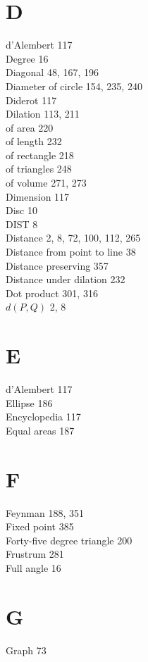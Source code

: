 \documentclass[12pt]{book} %
\begin{document}
\begin{ExerciseList}
\begin{ExerciseList}
\begin{ExerciseList}
\section*{D}
d'Alembert 117\\
Degree 16\\
Diagonal 48, 167, 196\\
Diameter of circle 154, 235, 240\\
Diderot 117\\
Dilation 113, 211\\
\hspace*{1em}of area 220\\
\hspace*{1em}of length 232\\
\hspace*{1em}of rectangle 218\\
\hspace*{1em}of triangles 248\\
\hspace*{1em}of volume 271, 273\\
Dimension 117\\
Disc 10\\
DIST 8\\
Distance 2, 8, 72, 100, 112, 265\\
Distance from point to line 38\\
Distance preserving 357\\
Distance under dilation 232\\
Dot product 301, 316\\
$d(P,Q)$ 2, 8

\section*{E}
d'Alembert 117\\
Ellipse 186\\
Encyclopedia 117\\
Equal areas 187

\section*{F}
Feynman 188, 351\\
Fixed point 385\\
Forty-five degree triangle 200\\
Frustrum 281\\
Full angle 16

\section*{G}
Graph 73


\end{ExerciseList}
\end{ExerciseList}
\end{ExerciseList}
\end{document}
